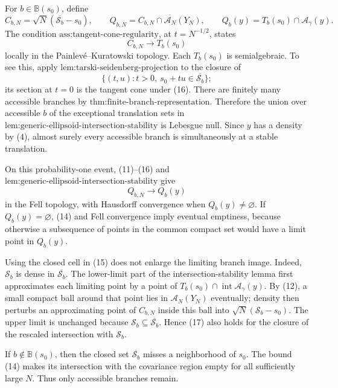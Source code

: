 For \(b\in\mathbb B(s_0)\), define
\[
 C_{b,N}=\sqrt N(\overline{\mathcal S_b}-s_0),
 \qquad
 Q_{b,N}=\overline{C_{b,N}\cap\mathcal A_N(Y_N)},
 \qquad
 Q_b(y)=T_b(s_0)\cap\mathcal A_\gamma(y).
 \tag{15}
\]
The condition \(\text{ass:tangent-cone-regularity}\), at \(t=N^{-1/2}\), states
\[
 C_{b,N}\longrightarrow T_b(s_0)
 \tag{16}
\]
locally in the Painlev\'e--Kuratowski topology.  Each \(T_b(s_0)\) is semialgebraic.  To see this, apply \(\text{lem:tarski-seidenberg-projection}\) to the closure of
\[
 \{(t,u):t>0,\ s_0+t u\in\overline{\mathcal S_b}\};
\]
its section at \(t=0\) is the tangent cone under (16).  There are finitely many accessible branches by \(\text{thm:finite-branch-representation}\).  Therefore the union over accessible \(b\) of the exceptional translation sets in \(\text{lem:generic-ellipsoid-intersection-stability}\) is Lebesgue null.  Since \(y\) has a density by (4), almost surely every accessible branch is simultaneously at a stable translation.

On this probability-one event, (11)--(16) and \(\text{lem:generic-ellipsoid-intersection-stability}\) give
\[
 Q_{b,N}\longrightarrow Q_b(y)
 \tag{17}
\]
in the Fell topology, with Hausdorff convergence when \(Q_b(y)\ne\varnothing\).  If \(Q_b(y)=\varnothing\), (14) and Fell convergence imply eventual emptiness, because otherwise a subsequence of points in the common compact set would have a limit point in \(Q_b(y)\).

Using the closed cell in (15) does not enlarge the limiting branch image.  Indeed, \(\mathcal S_b\) is dense in \(\overline{\mathcal S_b}\).  The lower-limit part of the intersection-stability lemma first approximates each limiting point by a point of \(T_b(s_0)\cap\operatorname{int}\mathcal A_\gamma(y)\).  By (12), a small compact ball around that point lies in \(\mathcal A_N(Y_N)\) eventually; density then perturbs an approximating point of \(C_{b,N}\) inside this ball into \(\sqrt N(\mathcal S_b-s_0)\).  The upper limit is unchanged because \(\mathcal S_b\subseteq\overline{\mathcal S_b}\).  Hence (17) also holds for the closure of the rescaled intersection with \(\mathcal S_b\).

If \(b\notin\mathbb B(s_0)\), then the closed set \(\overline{\mathcal S_b}\) misses a neighborhood of \(s_0\).  The bound (14) makes its intersection with the covariance region empty for all sufficiently large \(N\).  Thus only accessible branches remain.

